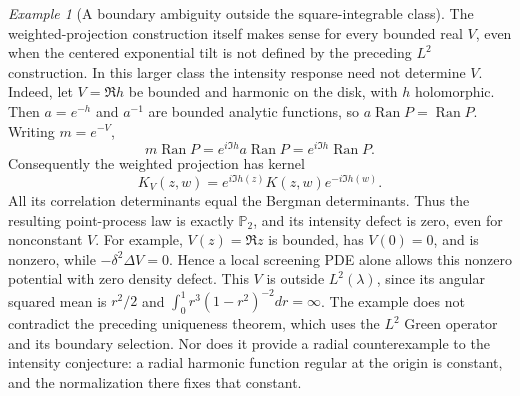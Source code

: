 \documentclass[11pt,a4paper]{article}
\numberwithin{equation}{section}
\theoremstyle{definition}
\theoremstyle{remark}
\newtheorem{example}[theorem]{Example}
\begin{document}
\begin{example}[A boundary ambiguity outside the square-integrable class]
\label{ex:screening-bounded-harmonic-gauge}
The weighted-projection construction itself makes sense for every
bounded real $V$, even when the centered exponential tilt is not
defined by the preceding $L^2$ construction.  In this larger class the
intensity response need not determine $V$.  Indeed, let $V=\Re h$ be
bounded and harmonic on the disk, with $h$ holomorphic.  Then
$a=e^{-h}$ and $a^{-1}$ are bounded analytic functions, so
$a\operatorname{Ran}P=\operatorname{Ran}P$.  Writing $m=e^{-V}$,
\[
 m\operatorname{Ran}P
 =e^{i\Im h}a\operatorname{Ran}P
 =e^{i\Im h}\operatorname{Ran}P.
\]
Consequently the weighted projection has kernel
\[
 K_V(z,w)=e^{i\Im h(z)}K(z,w)e^{-i\Im h(w)}.
\]
All its correlation determinants equal the Bergman determinants.
Thus the resulting point-process law is exactly $\mathbb P_2$, and
its intensity defect is zero, even for nonconstant $V$.  For example,
$V(z)=\Re z$ is bounded, has $V(0)=0$, and is nonzero, while
$-\delta^2\Delta V=0$.  Hence a local screening PDE alone allows
this nonzero potential with zero density defect.  This $V$ is outside
$L^2(\lambda)$, since its angular squared mean is $r^2/2$ and
$\int_0^1r^3(1-r^2)^{-2}dr=\infty$.
The example does not contradict the preceding uniqueness theorem,
which uses the $L^2$ Green operator and its boundary selection.
Nor does it provide a radial counterexample to the intensity
conjecture: a radial harmonic function regular at the origin is
constant, and the normalization there fixes that constant.
\end{example}
\end{document}
